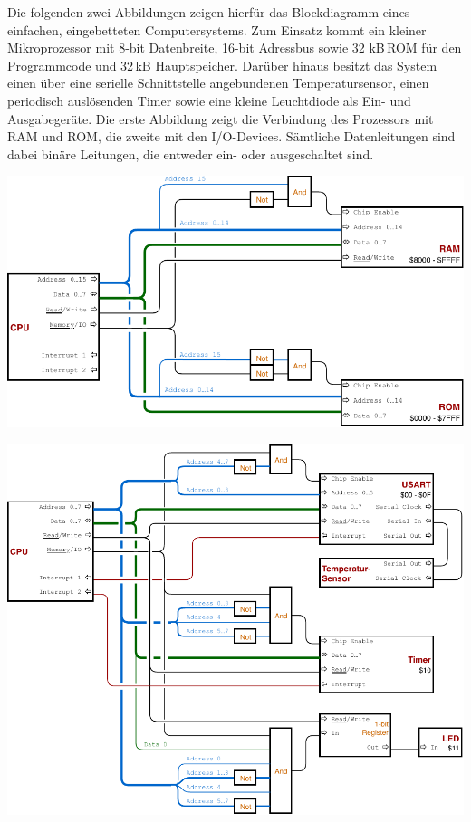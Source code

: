 Die folgenden zwei Abbildungen zeigen hierfür das Blockdiagramm eines einfachen,
eingebetteten Computersystems. Zum Einsatz kommt ein kleiner Mikroprozessor
mit 8-bit Datenbreite, 16-bit Adressbus sowie 32 kB\,ROM für den Programmcode
und 32\,kB Hauptspeicher. Darüber hinaus besitzt das System einen über eine
serielle Schnittstelle angebundenen Temperatursensor, einen periodisch
auslösenden Timer sowie eine kleine Leuchtdiode als Ein- und Ausgabegeräte.
Die erste Abbildung zeigt die Verbindung des Prozessors mit RAM und ROM, die
zweite mit den I/O-Devices. Sämtliche Datenleitungen sind dabei binäre Leitungen,
die entweder ein- oder ausgeschaltet sind.

\bigskip
\includegraphics[width=\textwidth]{1-grundlagen/img/aufgabe-rechnerarchitektur-1}

\includegraphics[width=\textwidth]{1-grundlagen/img/aufgabe-rechnerarchitektur-2}
\bigskip


